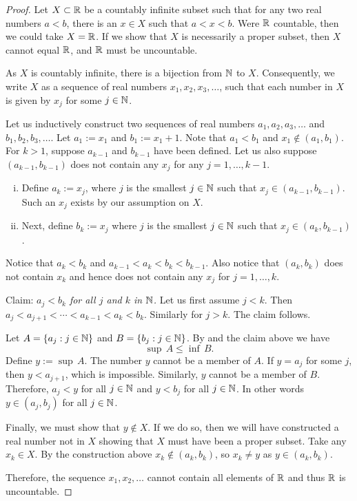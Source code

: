 \begin{proof}
Let $X \subset {\mathbb{R}}$ be a countably infinite
subset such that for any two real numbers
$a < b$, there is an $x \in X$ such that $a < x < b$.  Were ${\mathbb{R}}$ countable,
then we could take $X = {\mathbb{R}}$.  If we show that $X$ is necessarily
a proper subset, then $X$ cannot equal ${\mathbb{R}}$, and ${\mathbb{R}}$ must be
uncountable.

As $X$ is countably infinite, 
there is a bijection from ${\mathbb{N}}$ to $X$.  Consequently, we write $X$ as
a sequence of real numbers $x_1, x_2, x_3,\ldots$, such that
each number in $X$
is given by $x_j$ for some $j \in {\mathbb{N}}$.

Let us inductively
construct two sequences of real numbers $a_1,a_2,a_3,\ldots$ and
$b_1,b_2,b_3,\ldots$.  Let
$a_1 := x_1$ and $b_1 := x_1+1$.  Note that $a_1 < b_1$ and
$x_1 \notin (a_1,b_1)$.
For $k > 1$, suppose $a_{k-1}$ and $b_{k-1}$ have been defined.
Let us also suppose $(a_{k-1},b_{k-1})$ does not contain any $x_j$
for any $j=1,\ldots,k-1$.
\begin{enumerate}[(i)]
\item Define $a_k := x_j$, where $j$ is the smallest $j \in {\mathbb{N}}$
such that $x_j \in (a_{k-1},b_{k-1})$.  Such an $x_j$ exists by our
assumption on $X$.  
\item Next, define $b_k := x_j$ where $j$ is the smallest $j \in {\mathbb{N}}$
such that $x_j \in (a_{k},b_{k-1})$.
\end{enumerate}
Notice that $a_k < b_k$ and $a_{k-1} < a_k < b_k < b_{k-1}$.
Also notice that $(a_{k},b_{k})$ does not contain $x_k$ and hence
does not contain any $x_j$ for $j=1,\ldots,k$.

Claim: \emph{$a_j < b_k$ for all $j$ and $k$ in ${\mathbb{N}}$.}  Let us first
assume $j < k$.  Then $a_j < a_{j+1} < \cdots < a_{k-1} < a_k < b_k$.
Similarly for $j > k$.  The claim follows.

Let $A = \{ a_j : j \in {\mathbb{N}} \}$ and $B = \{ b_j : j \in {\mathbb{N}} \}$.
By  and the claim above we have
\begin{equation*}
\sup\, A \leq \inf\, B .
\end{equation*}
Define $y := \sup\, A$.  The number $y$ cannot be a member of $A$.  If $y = a_j$
for some $j$, then $y < a_{j+1}$, which is impossible.
Similarly, $y$ cannot be a member of $B$.  Therefore,
$a_j < y$ for all $j\in {\mathbb{N}}$
and $y < b_j$ for all $j\in {\mathbb{N}}$.
In other words $y \in (a_j,b_j)$ for all $j\in {\mathbb{N}}$.

Finally, we must show that $y \notin X$.  If we do so, then we will have
constructed a real number not in $X$ showing that $X$ must have been a
proper subset.  Take any $x_k \in X$.  By the construction above
$x_k \notin (a_k,b_k)$, so $x_k \not= y$ as $y \in (a_k,b_k)$.

Therefore, the sequence $x_1,x_2,\ldots$ cannot contain all elements of ${\mathbb{R}}$
and thus ${\mathbb{R}}$ is uncountable.
\end{proof}

